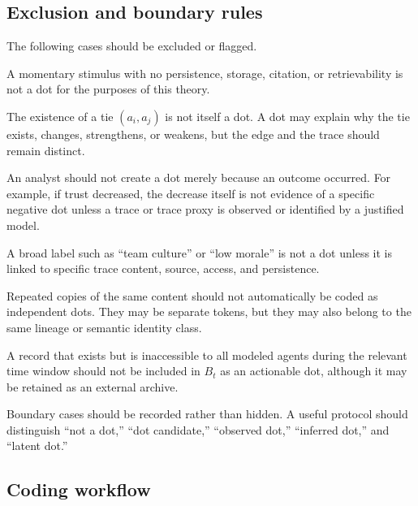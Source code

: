 \documentclass[11pt]{article}
\theoremstyle{remark}
\begin{document}
\subsection{Exclusion and boundary rules}\label{exclusion-boundary-rules}

The following cases should be excluded or flagged.

\begin{description}[leftmargin=3.2cm,style=nextline]
\item[Transient stimulus]
A momentary stimulus with no persistence, storage, citation, or
retrievability is not a dot for the purposes of this theory.

\item[Pure social edge]
The existence of a tie \((a_i,a_j)\) is not itself a dot. A dot may explain
why the tie exists, changes, strengthens, or weakens, but the edge and the
trace should remain distinct.

\item[Outcome-only pseudo-dot]
An analyst should not create a dot merely because an outcome occurred. For
example, if trust decreased, the decrease itself is not evidence of a
specific negative dot unless a trace or trace proxy is observed or
identified by a justified model.

\item[Unassigned aggregate attribute]
A broad label such as ``team culture'' or ``low morale'' is not a dot
unless it is linked to specific trace content, source, access, and
persistence.

\item[Duplicate surface form]
Repeated copies of the same content should not automatically be coded as
independent dots. They may be separate tokens, but they may also belong to
the same lineage or semantic identity class.

\item[Inaccessible artifact]
A record that exists but is inaccessible to all modeled agents during the
relevant time window should not be included in \(B_t\) as an actionable
dot, although it may be retained as an external archive.
\end{description}

Boundary cases should be recorded rather than hidden. A useful protocol
should distinguish ``not a dot,'' ``dot candidate,'' ``observed dot,''
``inferred dot,'' and ``latent dot.''

\subsection{Coding workflow}\label{coding-workflow}
\end{document}
